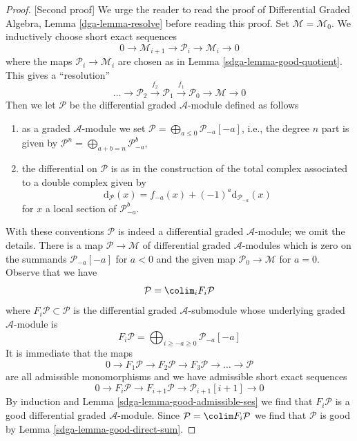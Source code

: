 \begin{proof}
[Second proof]
We urge the reader to read the proof of Differential Graded Algebra,
Lemma \ref{dga-lemma-resolve} before reading this proof.
Set $\mathcal{M} = \mathcal{M}_0$.
We inductively choose short exact sequences
$$
0 \to \mathcal{M}_{i + 1} \to \mathcal{P}_i \to \mathcal{M}_i \to 0
$$
where the maps
$\mathcal{P}_i \to \mathcal{M}_i$ are chosen as in
Lemma \ref{sdga-lemma-good-quotient}.
This gives a ``resolution''
$$
\ldots \to \mathcal{P}_2 \xrightarrow{f_2}
\mathcal{P}_1 \xrightarrow{f_1} \mathcal{P}_0 \to \mathcal{M} \to 0
$$
Then we let $\mathcal{P}$ be the differential graded
$\mathcal{A}$-module defined as follows
\begin{enumerate}
\item as a graded $\mathcal{A}$-module we set
$\mathcal{P} = \bigoplus_{a \leq 0} \mathcal{P}_{-a}[-a]$, i.e.,
the degree $n$ part is given by
$\mathcal{P}^n = \bigoplus\nolimits_{a + b = n} \mathcal{P}_{-a}^b$,
\item the differential on $\mathcal{P}$ is as in the construction of
the total complex associated to a double complex given by
$$
\text{d}_\mathcal{P}(x) = f_{-a}(x) + (-1)^a \text{d}_{\mathcal{P}_{-a}}(x)
$$
for $x$ a local section of $\mathcal{P}_{-a}^b$.
\end{enumerate}
With these conventions $\mathcal{P}$ is indeed a
differential graded $\mathcal{A}$-module; we omit the details.
There is a map $\mathcal{P} \to \mathcal{M}$ of differential graded
$\mathcal{A}$-modules which is zero on the summands $\mathcal{P}_{-a}[-a]$
for $a < 0$ and the given map $\mathcal{P}_0 \to \mathcal{M}$ for $a = 0$.
Observe that we have
$$
\mathcal{P} = \colim_i F_i\mathcal{P}
$$
where $F_i\mathcal{P} \subset \mathcal{P}$ is the differential
graded $\mathcal{A}$-submodule whose underlying graded $\mathcal{A}$-module
is
$$
F_i\mathcal{P} =
\bigoplus\nolimits_{i \geq -a \geq 0} \mathcal{P}_{-a}[-a]
$$
It is immediate that the maps
$$
0 \to F_1\mathcal{P} \to F_2\mathcal{P} \to F_3\mathcal{P} \to
\ldots \to \mathcal{P}
$$
are all admissible monomorphisms and we have admissible short exact sequences
$$
0 \to F_i\mathcal{P} \to
F_{i + 1}\mathcal{P} \to
\mathcal{P}_{i + 1}[i + 1] \to 0
$$
By induction and Lemma \ref{sdga-lemma-good-admissible-ses}
we find that $F_i\mathcal{P}$ is a good differential graded
$\mathcal{A}$-module. Since $\mathcal{P} = \colim F_i\mathcal{P}$
we find that $\mathcal{P}$ is good by Lemma \ref{sdga-lemma-good-direct-sum}.


\end{proof}
